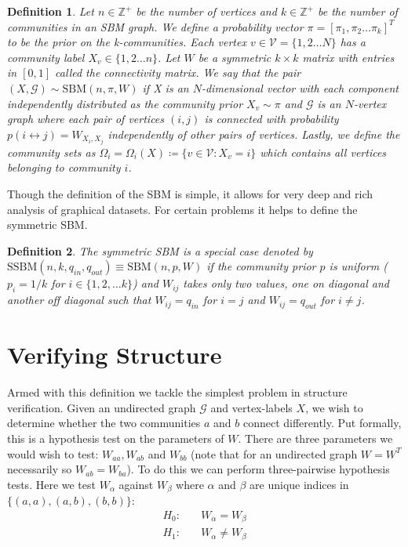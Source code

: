 \documentclass[]{article}
\newcommand{\Gcal}{\mathcal{G}}
\newcommand{\Vcal}{\mathcal{V}}
\newcommand{\Integers}{\mathbb{Z}}
\newtheorem{definition}{Definition}[section]
\begin{document}
\begin{definition}
	\label{defn:sbm}
	Let $n \in \Integers^+$ be the number of vertices and $k \in \Integers^+$ be the number of communities in an SBM graph. We define a probability vector $\pi = [\pi_1, \pi_2 \dots \pi_k]^T$ to be the prior on the k-communities. Each vertex $v \in \Vcal = \{1, 2 \dots N\}$ has a community label $X_v \in \{1, 2 \dots n\}$. Let $W$ be a symmetric $k \times k$ matrix with entries in $[0,1]$ called the connectivity matrix. We say that the pair $(X, \Gcal) \sim \textrm{SBM}(n, \pi, W)$ if X is an $N$-dimensional vector with each component independently distributed as the community prior $X_v \sim \pi$ and $\Gcal$ is an $N$-vertex graph where each pair of vertices $(i, j)$ is connected with probability $p(i \leftrightarrow j) = W_{X_i, X_j}$ independently of other pairs of vertices. Lastly, we define the community sets as $\Omega_i = \Omega_i(X) \coloneqq \{v \in \Vcal : X_v = i\}$ which contains all vertices belonging to community $i$.
\end{definition}

Though the definition of the SBM is simple, it allows for very deep and rich analysis of graphical datasets. For certain problems it helps to define the symmetric SBM.

\begin{definition}
	\label{defn:sym-sbm}
	The symmetric SBM is a special case denoted by $\textrm{SSBM}(n, k, q_{in}, q_{out}) \equiv \textrm{SBM}(n, p, W)$ if the community prior $p$ is uniform ($p_i = 1/k$ for $i \in \{1, 2, \dots k\}$) and $W_{ij}$ takes only two values, one on diagonal and another off diagonal such that $W_{ij} = q_{in}$ for $i=j$ and $W_{ij} = q_{out}$ for $i \neq j$.
\end{definition}

\section{Verifying Structure}

Armed with this definition we tackle the simplest problem in structure verification. Given an undirected graph $\Gcal$ and vertex-labels $X$, we wish to determine whether the two communities $a$ and $b$ connect differently. Put formally, this is a hypothesis test on the parameters of $W$. There are three parameters we would wish to test: $W_{aa}, W_{ab}$ and $W_{bb}$ (note that for an undirected graph $W = W^T$ necessarily so $W_{ab} = W_{ba}$). To do this we can perform three-pairwise hypothesis tests. Here we test $W_{\alpha}$ against $W_{\beta}$ where $\alpha$ and $\beta$ are unique indices in $\{(a,a), (a, b), (b,b)\}$:
%
\begin{equation}
\begin{aligned}
	H_0:& \quad W_{\alpha} = W_{\beta} \\
	H_1:& \quad W_{\alpha} \neq W_{\beta}
\end{aligned}
\end{equation}
\end{document}
